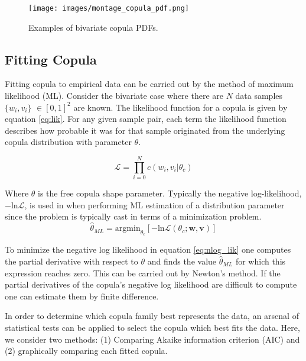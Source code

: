 \begin{figure}[!htbp]
	\centering
	\texttt{[image: images/montage\_copula\_pdf.png]}
	\caption{Examples of bivariate copula PDFs.}
	\label{fig:montage_cop}
\end{figure}

\subsection{Fitting Copula}
\label{sec:fitting_copula}

Fitting copula to empirical data can be carried out by the method of maximum likelihood (ML).  Consider the bivariate case where there are $N$ data samples $\{w_i, v_i\}$ $\in [0,1]^2$ are known. The likelihood function for a copula is given by equation \ref{eq:lik}.  For any given sample pair, each term the likelihood function describes how probable it was for that sample originated from the underlying copula distribution with parameter $\theta$.

\begin{equation}
\mathcal{L}= \prod_{i=0}^N c(w_i, v_i|\theta_c)
\label{eq:lik}
\end{equation}

Where $\theta$ is the free copula shape parameter.
Typically the negative log-likelihood, $-\mathrm{ln}\mathcal{L}$, is used in when performing ML estimation of a distribution parameter since the problem is typically cast in terms of a minimization problem.  
\begin{equation}
\hat \theta_{ML} = \mathrm{argmin}_{\theta_c}[-\mathrm{ln}\mathcal{L}(\theta_{c} ; \mathbf w, \mathbf v)]
\label{eq:nlog_lik}
\end{equation}

To minimize the negative log likelihood in equation \ref{eq:nlog_lik}  one computes the partial derivative with respect to $\theta$ and finds the value $\hat \theta_{ML}$ for which this expression reaches zero.  This can be carried out by Newton's method.  If the partial derivatives of the copula's negative log likelihood are difficult to compute one can estimate them by finite difference. 

In order to determine which copula family best represents the data, an arsenal of statistical tests can be applied to select the copula which best fits the data.  Here, we consider two methods:  (1) Comparing Akaike information criterion (AIC) and (2) graphically comparing each fitted copula.  

